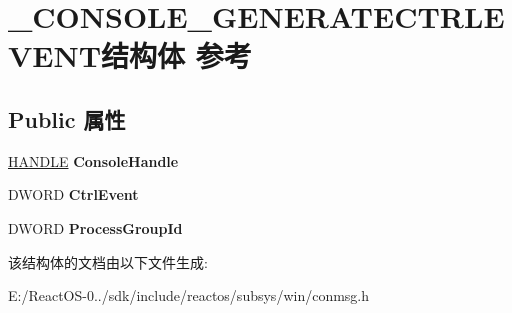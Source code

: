 \hypertarget{struct___c_o_n_s_o_l_e___g_e_n_e_r_a_t_e_c_t_r_l_e_v_e_n_t}{}\section{\+\_\+\+C\+O\+N\+S\+O\+L\+E\+\_\+\+G\+E\+N\+E\+R\+A\+T\+E\+C\+T\+R\+L\+E\+V\+E\+N\+T结构体 参考}
\label{struct___c_o_n_s_o_l_e___g_e_n_e_r_a_t_e_c_t_r_l_e_v_e_n_t}
\subsection*{Public 属性}
\begin{DoxyCompactItemize}
\item 
\mbox{\label{struct___c_o_n_s_o_l_e___g_e_n_e_r_a_t_e_c_t_r_l_e_v_e_n_t_a08386c4bf0d60990ed0c0c08b2beb314}} 
\hyperlink{interfacevoid}{H\+A\+N\+D\+LE} {\bfseries Console\+Handle}
\item 
\mbox{\label{struct___c_o_n_s_o_l_e___g_e_n_e_r_a_t_e_c_t_r_l_e_v_e_n_t_af3c9ff67d0da99de37f689448a7768e4}} 
D\+W\+O\+RD {\bfseries Ctrl\+Event}
\item 
\mbox{\label{struct___c_o_n_s_o_l_e___g_e_n_e_r_a_t_e_c_t_r_l_e_v_e_n_t_a0c4bb5819d414c0957d4a34c838ef7ee}} 
D\+W\+O\+RD {\bfseries Process\+Group\+Id}
\end{DoxyCompactItemize}


该结构体的文档由以下文件生成\+:\begin{DoxyCompactItemize}
\item 
E\+:/\+React\+O\+S-\/0../sdk/include/reactos/subsys/win/conmsg.\+h\end{DoxyCompactItemize}
